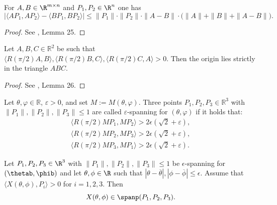 \begin{lemma} \label{lem:absscalar}
\leanok
    For $A,B\in \R^{m\times n}$ and $P_1,P_2\in \R^n$ one has
    $$|\langle AP_1,AP_2\rangle-\langle BP_1,BP_2\rangle|\leq \|P_1\|\cdot \|P_2\|\cdot \|A-B\|\cdot \bigg(\|A\|+\|B\| + \|A-B\|\bigg).$$
\end{lemma}

\begin{proof}
\leanok
See \cite{polyhedron.without.rupert}, Lemma 25.
\end{proof}

\begin{lemma} \label{lem:origintriangle}
\leanok
    Let $A,B,C\in \mathbb{R}^2$ be such that $
    \langle R({\pi/2}) A,B\rangle,
    \langle R({\pi/2}) B,C\rangle,
    \langle R({\pi/2}) C,A\rangle >0$. Then the origin lies strictly in the triangle $ABC$.
\end{lemma}

\begin{proof}
\leanok
See \cite{polyhedron.without.rupert}, Lemma 26.
\end{proof}

\begin{definition}
  \label{def:eps-spanning}
  \leanok
  Let $\theta, \varphi \in \mathbb{R}$, $\varepsilon > 0$, and set $M := M(\theta, \varphi)$.
  Three points $P_1, P_2, P_3 \in \mathbb{R}^3$ with $\|P_1\|, \|P_2\|, \|P_3\| \leq 1$ are
  called $\varepsilon$-spanning for $(\theta, \varphi)$ if it holds that:
\begin{align*}
    \langle R(\pi/2) M P_1,M P_{2}\rangle > 2 \epsilon(\sqrt{2} + \varepsilon),\\
    \langle R(\pi/2) M P_2,M P_{3}\rangle > 2 \epsilon(\sqrt{2} + \varepsilon),\\
    \langle R(\pi/2) M P_3,M P_{1}\rangle > 2 \epsilon(\sqrt{2} + \varepsilon).
\end{align*}
\end{definition}


\begin{lemma} \label{lem:eps-spanning}
  \leanok
    Let $P_1, P_2, P_3 \in \R^3$ with $\|P_1\|,\|P_2\|,\|P_3\| \leq 1$ be $\epsilon$-spanning for $(\thetab, \phib)$ and let $\theta, \phi \in \R$ such that $|\theta - \overline{\theta}|, |\phi - \overline{\phi}| \leq \epsilon$. Assume that $\langle X(\theta, \phi), P_i \rangle > 0$ for $i=1,2,3$. Then
    \[
        X(\theta, \phi) \in \spanp(P_1, P_2, P_3).
    \]
\end{lemma}

